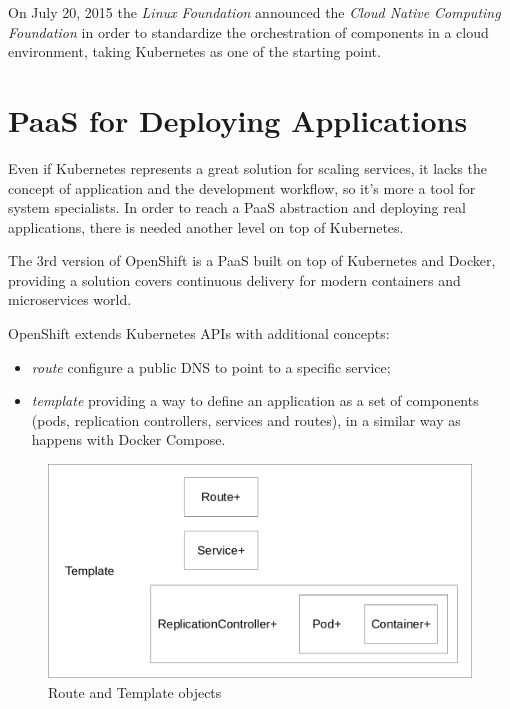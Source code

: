 On July 20, 2015 the \textit{Linux Foundation} announced the \textit{Cloud Native Computing Foundation}\cite{CloudNativeComputingFoundation} in order to standardize the orchestration of components in a cloud environment, taking Kubernetes as one of the starting point.

\section{PaaS for Deploying Applications}\label{paas-for-deploying-applications}

Even if Kubernetes represents a great solution for scaling services, it lacks the concept of application and
the development workflow, so it's more a tool for system specialists. In order to reach a PaaS abstraction and deploying real applications, there is needed another level on top of Kubernetes.

The 3rd version of OpenShift is a PaaS built on top of Kubernetes and Docker, providing a solution covers continuous delivery for modern containers and microservices world.

OpenShift extends Kubernetes APIs with additional concepts:

\begin{itemize}
\item \textit{route} configure a public DNS to point to a specific service;
\item \textit{template} providing a way to define an application as a set of components (pods, replication controllers, services and routes), in a similar way as happens with Docker Compose.
\end{itemize}

\begin{figure}[htbp]
\centering
\includegraphics{media/ch5-template.png}
\caption{Route and Template objects}
\end{figure}

